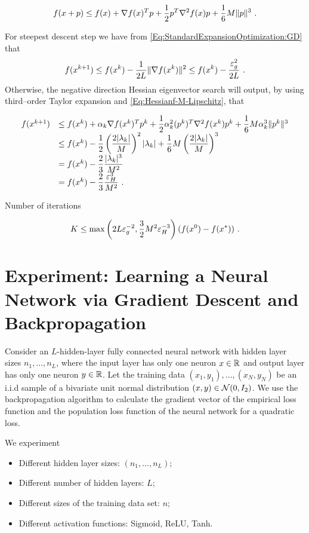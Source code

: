 \begin{equation}\label{Eq:TaylorCubicUpperBound}
f(x+p)\leq f(x)+\nabla f(x)^T p+\dfrac{1}{2}p^T \nabla^2 f(x)p+\dfrac{1}{6}M\|p\|^3 \ .
\end{equation}

For steepest descent step we have from \eqref{Eq:StandardExpansionOptimization:GD} that
$$f(x^{k+1})\leq f(x^k)-\dfrac{1}{2L}\|\grad f(x^k)\|^2\leq f(x^k)-\dfrac{\ve_g^2}{2L} \ .$$
Otherwise, the negative direction Hessian eigenvector search will output, by using third--order Taylor expansion and 
\eqref{Eq:Hessianf-M-Lipschitz}, that 

$$\begin{array}{ll}
f(x^{k+1})&\leq f(x^k)+\alpha_k\nabla f(x^k)^T p^k+\dfrac{1}{2}\alpha_k^2(p^k)^T\nabla^2 f(x^k)p^k+\dfrac{1}{6}M\alpha_k^3\|p^k\|^3
\\
&\leq f(x^k)-\dfrac{1}{2}\left(\dfrac{2|\lambda_k|}{M}\right)^2|\lambda_k|+\dfrac{1}{6}M\left(\dfrac{2|\lambda_k|}{M}\right)^3
\\
&=f(x^k)-\dfrac{2}{3}\dfrac{|\lambda_k|^3}{M^2}
\\
&=f(x^k)-\dfrac{2}{3}\dfrac{\varepsilon_H^3}{M^2} \ .
\end{array}$$

Number of iterations

$$K\leq \max\left(2L\varepsilon_g^{-2}, \dfrac{3}{2}M^2\varepsilon_H^{-3}\right)(f(x^0)-f(x^*)) \ .$$

\section{Experiment: Learning a Neural Network via Gradient Descent and Backpropagation}

Consider an $L$-hidden-layer fully connected neural network with hidden layer sizes $n_1, ..., n_L$, where the input layer has only one neuron $x\in \mathbb R$
 and output layer has only one neuron $y\in \mathbb R$. Let the training data $(x_1, y_1), ..., (x_N, y_N)$ be an i.i.d sample of a bivariate unit normal distribution $(x,y)\in \mathcal N(0, I_2)$. We use the backpropagation algorithm to calculate the gradient vector of the empirical loss function and the population loss function of the neural network for a quadratic loss.

We experiment 

\begin{itemize}
\item[(1)] Different hidden layer sizes: $(n_1, ..., n_L)$;

\item[(2)] Different number of hidden layers: $L$;

\item[(3)] Different sizes of the training data set: $n$;

\item[(4)] Different activation functions: Sigmoid, ReLU, Tanh.
\end{itemize}  

